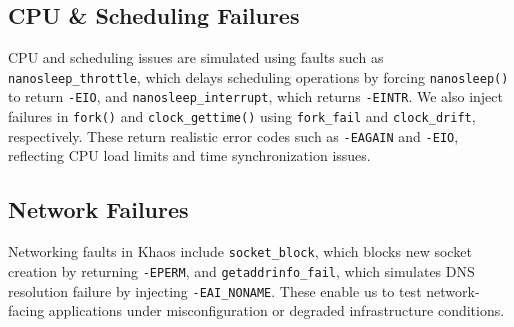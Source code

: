 \subsection{CPU \& Scheduling Failures}

CPU and scheduling issues are simulated using faults such as \texttt{nanosleep\_throttle}, which delays scheduling operations by forcing \texttt{nanosleep()} to return \texttt{-EIO}, and \texttt{nanosleep\_interrupt}, which returns \texttt{-EINTR}. We also inject failures in \texttt{fork()} and \texttt{clock\_gettime()} using \texttt{fork\_fail} and \texttt{clock\_drift}, respectively. These return realistic error codes such as \texttt{-EAGAIN} and \texttt{-EIO}, reflecting CPU load limits and time synchronization issues.


\begin{table}[ht]
\centering
\caption{CPU Failures (Compute \& Scheduling)}
\label{cpu_failures}
\end{table}

\subsection{Network Failures}

Networking faults in Khaos include \texttt{socket\_block}, which blocks new socket creation by returning \texttt{-EPERM}, and \texttt{getaddrinfo\_fail}, which simulates DNS resolution failure by injecting \texttt{-EAI\_NONAME}. These enable us to test network-facing applications under misconfiguration or degraded infrastructure conditions.


